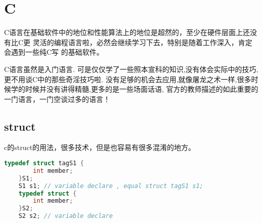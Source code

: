\chapter{C}

C语言在基础软件中的地位和性能算法上的地位是超然的，至少在硬件层面上还没有比C更
灵活的编程语言啦，必然会继续学习下去，特别是随着工作深入，肯定会遇到一些纯C写
的基础软件。

C语言虽然是入门语言. 可是仅仅学了一些照本宣科的知识,没有体会实际中的技巧,更不用谈C中的那些奇淫技巧啦.
没有足够的机会去应用,就像屠龙之术一样,很多时候学的时候并没有讲得精髓,更多的是一些场面话语,
官方的教师描述的如此重要的一门语言，一门空谈过多的语言！

\section{ struct }
c的struct的用法，很多技术，但是也容易有很多混淆的地方。
\begin{lstlisting}[language=C]
    typedef struct tagS1 {
        int member;
    }S1;
    S1 s1; // variable declare , equal struct tagS1 s1;
    typedef struct {
        int member;
    }S2;
    S2 s2; // variable declare
\end{lstlisting}


